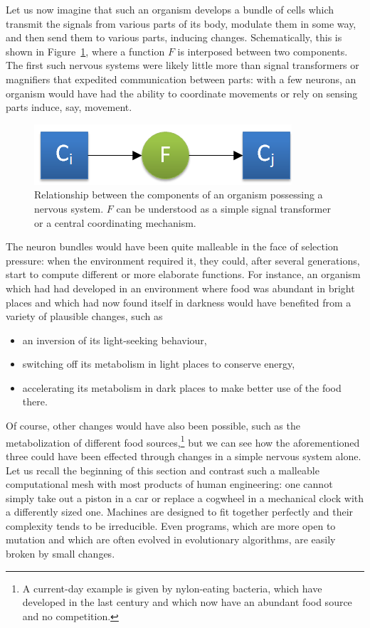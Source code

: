 \documentclass[]{scrartcl}
\theoremstyle{break}
\begin{document}
Let us now imagine that such an organism develops a bundle of cells which transmit the signals from various parts of its body, modulate them in some way, and then send them to various parts, inducing changes. Schematically, this is shown in Figure~\ref{fig:nervousSystem}, where a function $F$ is interposed between two components. The first such nervous systems were likely little more than signal transformers or magnifiers that expedited communication between parts: with a few neurons, an organism would have had the ability to coordinate movements or rely on sensing parts induce, say, movement.

\begin{figure}
	\centering
	\includegraphics{figs/nervousSystem.png}
	\caption{Relationship between the components of an organism possessing a nervous system. $F$ can be understood as a simple signal transformer or a central coordinating mechanism.}
	\label{fig:nervousSystem}
\end{figure}

The neuron bundles would have been quite malleable in the face of selection pressure: when the environment required it, they could, after several generations, start to compute different or more elaborate functions. For instance, an organism which had had developed in an environment where food was abundant in bright places and which had now found itself in darkness would have benefited from a variety of plausible changes, such as
\begin{itemize}
	\item an inversion of its light-seeking behaviour,
	\item switching off its metabolism in light places to conserve energy,
	\item accelerating its metabolism in dark places to make better use of the food there.
\end{itemize}

Of course, other changes would have also been possible, such as the metabolization of different food sources,\footnote{A current-day example is given by nylon-eating bacteria, which have developed in the last century and which now have an abundant food source and no competition.} but we can see how the aforementioned three could have been effected through changes in a simple nervous system alone. Let us recall the beginning of this section and contrast such a malleable computational mesh with most products of human engineering: one cannot simply take out a piston in a car or replace a cogwheel in a mechanical clock with a differently sized one. Machines are designed to fit together perfectly and their complexity tends to be irreducible. Even programs, which are more open to mutation and which are often evolved in evolutionary algorithms, are easily broken by small changes.
\end{document}
